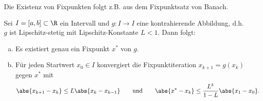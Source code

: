 Die Existenz von Fixpunkten folgt z.B. aus dem Fixpunktsatz von Banach.
\begin{satz}
Sei $I=\left[a,b \right] \subset \R$ ein Intervall und $g \colon I \to I$ eine kontrahierende Abbildung,
d.h.\ $g$ ist Lipschitz-stetig mit Lipschitz-Konstante $L<1$. Dann folgt:
\begin{enumerate}[a)]
 \item Es existiert genau ein Fixpunkt $x^*$ von $g$.
 \item Für jeden Startwert $x_0 \in I$ konvergiert die Fixpunktiteration
   $x_{k+1} = g(x_k)$ gegen $x^*$ mit
  \begin{equation*}
   \abs{ x_{k+1}-x_k } \leq L \abs{ x_k - x_{k-1}}
   \qquad \text{und} \qquad
   \abs{ x^* -x_k } \leq \frac{L^k}{1-L} \abs{ x_1-x_0 }.
  \end{equation*}
\end{enumerate}
\end{satz}
%
